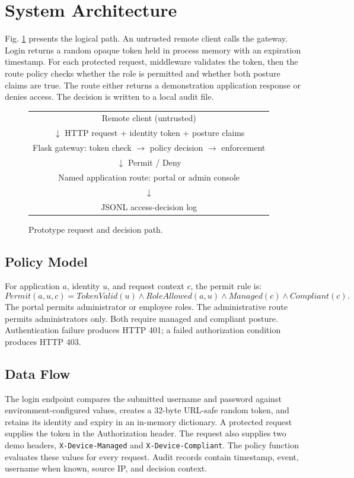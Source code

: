 \documentclass[conference]{IEEEtran}
\begin{document}
\section{System Architecture}
Fig. \ref{fig:arch} presents the logical path. An untrusted remote client calls the gateway. Login returns a random opaque token held in process memory with an expiration timestamp. For each protected request, middleware validates the token, then the route policy checks whether the role is permitted and whether both posture claims are true. The route either returns a demonstration application response or denies access. The decision is written to a local audit file.
\begin{figure}[ht]
\centering
\begin{tabular}{c}
Remote client (untrusted)\\$\downarrow$ HTTP request + identity token + posture claims\\
Flask gateway: token check $\rightarrow$ policy decision $\rightarrow$ enforcement\\$\downarrow$ Permit / Deny\\
Named application route: portal or admin console\\$\downarrow$\\JSONL access-decision log
\end{tabular}
\caption{Prototype request and decision path.}
\label{fig:arch}
\end{figure}

\subsection{Policy Model}
For application $a$, identity $u$, and request context $c$, the permit rule is:
\begin{equation}
Permit(a,u,c)=TokenValid(u) \land RoleAllowed(a,u) \land Managed(c) \land Compliant(c).
\end{equation}
The portal permits administrator or employee roles. The administrative route permits administrators only. Both require managed and compliant posture. Authentication failure produces HTTP 401; a failed authorization condition produces HTTP 403.

\subsection{Data Flow}
The login endpoint compares the submitted username and password against environment-configured values, creates a 32-byte URL-safe random token, and retains its identity and expiry in an in-memory dictionary. A protected request supplies the token in the Authorization header. The request also supplies two demo headers, \texttt{X-Device-Managed} and \texttt{X-Device-Compliant}. The policy function evaluates these values for every request. Audit records contain timestamp, event, username when known, source IP, and decision context.
\end{document}
